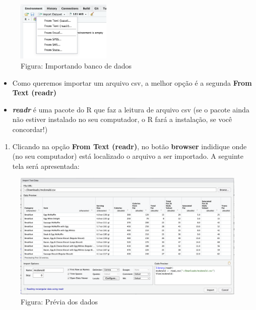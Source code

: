 \documentclass[
]{book}
\providecommand{\tightlist}{%
  \setlength{\itemsep}{0pt}\setlength{\parskip}{0pt}}
\begin{document}
\begin{figure}
\centering
\includegraphics[width=0.4\textwidth,height=\textheight]{telaImportDataset.png}
\caption{ Figura: Importando banco de dados}
\end{figure}

\begin{itemize}
\item
  Como queremos importar um arquivo csv, a melhor opção é a segunda \textbf{From Text (readr)}
\item
  \textbf{\emph{readr}} é uma pacote do R que faz a leitura de arquivo csv (se o pacote ainda não estiver instalado no seu computador, o R fará a instalação, se você concordar!)
\end{itemize}

\begin{enumerate}
\def\labelenumi{\arabic{enumi}.}
\setcounter{enumi}{2}
\tightlist
\item
  Clicando na opção \textbf{From Text (readr)}, no botão \textbf{browser} indidique onde (no seu computador) está localizado o arquivo a ser importado. A seguinte tela será apresentada:
\end{enumerate}

\begin{figure}
\centering
\includegraphics{telaImportBrowser.png}
\caption{ Figura: Prévia dos dados}
\end{figure}
\end{document}
